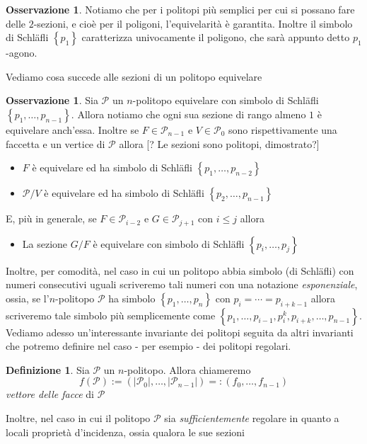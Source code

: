 \documentclass[a4paper,12pt]{report}
\newcommand{\p}{\mathcal{P}}
\theoremstyle{plain}
\theoremstyle{definition}
\newtheorem{defin}[teo]{Definizione}
\newtheorem{oss}[teo]{Osservazione}
\begin{document}
\begin{oss}
Notiamo che per i politopi pi\`u semplici per cui si possano fare delle $2$-sezioni, e cio\`e per il poligoni, l'equivelarit\`a \`e garantita. Inoltre
il simbolo di Schl\"afli $\left\{p_1\right\}$ caratterizza univocamente il poligono, che sar\`a appunto detto $p_1$-agono.
\end{oss}
Vediamo cosa succede alle sezioni di un politopo equivelare
\begin{oss}
Sia $\p$ un $n$-politopo equivelare con simbolo di Schl\"afli $\left\{p_1,\dots,p_{n-1}\right\}$.
Allora notiamo che ogni sua sezione di rango almeno $1$ \`e equivelare anch'essa. Inoltre se $F\in\p_{n-1}$ e $V\in\p_0$ sono rispettivamente una faccetta
e un vertice di $\p$ allora [? Le sezioni sono politopi, dimostrato?]
\begin{itemize}
\item $F$ \`e equivelare ed ha simbolo di Schl\"afli $\left\{p_1,\dots,p_{n-2}\right\}$
\item $\p/V$ \`e equivelare ed ha simbolo di Schl\"afli $\left\{p_2,\dots,p_{n-1}\right\}$
\end{itemize}
E, pi\`u in generale, se $F\in\p_{i-2}$ e $G\in\p_{j+1}$ con $i\leq j$ allora
\begin{itemize}
\item La sezione $G/F$ \`e equivelare con simbolo di Schl\"afli $\left\{p_i,\dots,p_j\right\}$
\end{itemize}
\end{oss}
Inoltre, per comodit\`a, nel caso in cui un politopo abbia simbolo (di Schl\"afli) con numeri consecutivi uguali scriveremo tali numeri con una
notazione \emph{esponenziale}, ossia, se l'$n$-politopo $\p$ ha simbolo $\left\{p_1,\dots,p_n\right\}$ con $p_i=\cdots=p_{i+k-1}$ allora scriveremo
tale simbolo pi\`u semplicemente come $\left\{p_1,\dots,p_{i-1},p_i^k,p_{i+k},\dots,p_{n-1}\right\}$.
Vediamo adesso un'interessante invariante dei politopi seguita da altri invarianti che potremo definire nel caso - per esempio - dei politopi regolari.
\begin{defin}
Sia $\p$ un $n$-politopo. Allora chiameremo
\begin{equation*}
f(\p):=\left(\left|\p_0\right|,\dots,\left|\p_{n-1}\right|\right)=:\left(f_0,\dots,f_{n-1}\right)
\end{equation*}
\emph{vettore delle facce} di $\p$
\end{defin}
Inoltre, nel caso in cui il politopo $\p$ sia \emph{sufficientemente} regolare in quanto a locali propriet\`a d'incidenza, ossia qualora le sue sezioni
\end{document}
